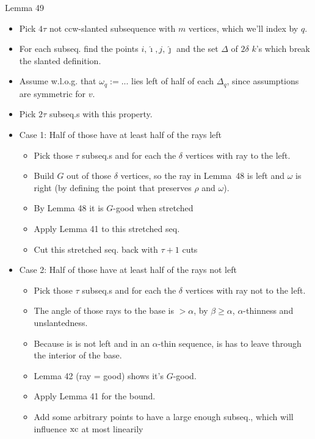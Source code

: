 Lemma 49
\begin{itemize}
  \item Pick $4\tau$ not ccw-slanted subsequence with $m$ vertices, which we'll index by $q$.
  \item For each subseq. find the points $i, \hat{\imath}, j, \hat{\jmath}$ and the set $\Delta$ of $2\delta$ $k$'s which break the slanted definition.
  \item Assume w.l.o.g. that $\omega_q := ...$ lies left of half of each $\Delta_q$, since assumptions are symmetric for $v$.
  \item Pick $2\tau$ subseq.s with this property.
  \item Case 1: Half of those have at least half of the rays left
  \begin{itemize}
    \item Pick those $\tau$ subseq.s and for each the $\delta$ vertices with ray to the left.
    \item Build $G$ out of those $\delta$ vertices, so the ray in Lemma~48 is left and $\omega$ is right (by defining the point that preserves $\rho$ and $\omega$).
    \item By Lemma 48 it is $G$-good when stretched
    \item Apply Lemma 41 to this stretched seq.
    \item Cut this stretched seq. back with $\tau+1$ cuts
  \end{itemize}
  \item Case 2: Half of those have at least half of the rays not left
  \begin{itemize}
    \item Pick those $\tau$ subseq.s and for each the $\delta$ vertices with ray not to the left.
    \item The angle of those rays to the base is $>\alpha$, by $\beta \geq \alpha$, $\alpha$-thinness and unslantedness.
    \item Because is is not left and in an $\alpha$-thin sequence, is has to leave through the interior of the base.
    \item Lemma 42 (ray = good) shows it's $G$-good.
    \item Apply Lemma 41 for the bound.
    \item Add some arbitrary points to have a large enough subseq., which will influence $\operatorname{xc}$ at most linearily
  \end{itemize}
\end{itemize}

